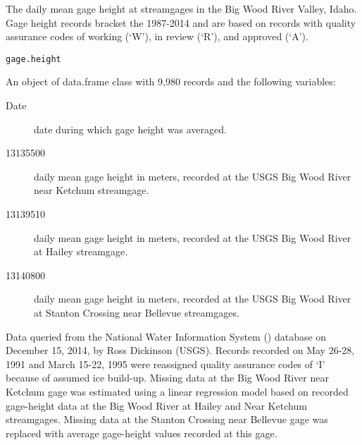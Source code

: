 \documentclass[a4paper]{book}
\begin{document}
%
\begin{Description}\relax
The daily mean gage height at streamgages in the Big Wood River Valley, Idaho.
Gage height records bracket the 1987-2014 and are based on records with
quality assurance codes of working (`W'), in review (`R'), and
approved (`A').
\end{Description}
%
\begin{Usage}
\begin{verbatim}
gage.height
\end{verbatim}
\end{Usage}
%
\begin{Format}
An object of data.frame class with 9,980 records and the following variables:
\begin{description}

\item[Date] date during which gage height was averaged.
\item[13135500] daily mean gage height in meters, recorded at the USGS
Big Wood River near Ketchum streamgage.
\item[13139510] daily mean gage height in meters, recorded at the USGS
Big Wood River at Hailey streamgage.
\item[13140800] daily mean gage height in meters, recorded at the USGS
Big Wood River at Stanton Crossing near Bellevue streamgages.

\end{description}

\end{Format}
%
\begin{Source}\relax
Data queried from the National Water Information System
() database on December 15, 2014,
by Ross Dickinson (USGS).
Records recorded on May 26-28, 1991 and March 15-22, 1995 were reassigned
quality assurance codes of `I' because of assumed ice build-up.
Missing data at the Big Wood River near Ketchum gage was estimated using a
linear regression model based on recorded gage-height data at the Big Wood River at
Hailey and Near Ketchum streamgages.
Missing data at the Stanton Crossing near Bellevue gage was replaced with
average gage-height values recorded at this gage.
\end{Source}
\end{document}
